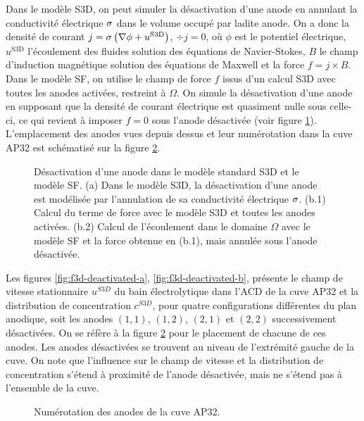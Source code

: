 Dans le modèle S3D, on peut simuler la désactivation d'une anode en
annulant la conductivité électrique $\sigma$ dans le volume
occupé par ladite anode. On a donc la densité de courant $j =
\sigma\left( \nabla \phi + u^\mathrm{S3D} \right)$, $\div j = 0$,
où $\phi$ est le potentiel électrique, $u^\mathrm{S3D}$
l'écoulement des fluides solution des équations de Navier-Stokes,
$B$ le champ d'induction magnétique solution des équations de
Maxwell et la force $f = j\times B$. Dans le modèle SF, on utilise le
champ de force $f$ issus d'un calcul S3D avec toutes les anodes
activées, restreint à $\Omega$. On simule la désactivation d'une
anode en supposant que la densité de courant électrique est quasiment nulle
sous celle-ci, ce qui revient à imposer
$f = 0$ sous  l'anode désactivée (voir figure
\ref{fig:anode-deactivation}). L'emplacement des anodes vues depuis dessus et leur
numérotation dans la cuve AP32 est schématisé sur la figure
\ref{fig:anode-numerotations}.

\begin{figure}[t]
  \begin{center}
    
    \caption{Désactivation d'une anode dans le modèle standard S3D et
      le modèle SF. (a) Dans le modèle S3D, la désactivation d'une
      anode est modélisée par l'annulation de sa conductivité
      électrique $\sigma$. (b.1) Calcul du terme de force avec
      le modèle S3D et toutes les anodes activées. (b.2) Calcul de
      l'écoulement dans le domaine $\Omega$ avec le modèle SF et la
      force obtenue en (b.1), mais annulée sous l'anode désactivée.}
    \label{fig:anode-deactivation}
  \end{center}
\end{figure}
Les figures \ref{fig:f3d-deactivated-a}, \ref{fig:f3d-deactivated-b}, présente
le champ de vitesse stationnaire $u^{S3D}$ du bain électrolytique dans l'ACD de
la cuve AP32 et la distribution de concentration $c^{S3D}$, pour quatre configurations différentes du plan
anodique, soit les anodes $(1,1)$, $(1,2)$, $(2,1)$ et $(2,2)$
successivement désactivées. On se réfère à la figure
\ref{fig:anode-numerotations} pour le placement de chacune de ces
anodes. Les anodes désactivées se trouvent au niveau de
l'extrémité gauche de la cuve. On note que l'influence sur le champ de
vitesse et la distribution de concentration s'étend à proximité de
l'anode désactivée, mais ne s'étend pas à l'ensemble de la cuve.

\begin{figure}[t]
  \begin{center}
    
    \caption{Numérotation des anodes de la cuve AP32.}
    \label{fig:anode-numerotations}
  \end{center}
\end{figure}

